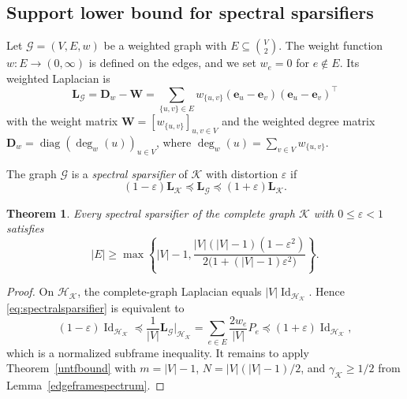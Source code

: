 \documentclass[a4paper]{amsart}
\numberwithin{equation}{section}
\newtheorem{theorem}{Theorem}[section]
\DeclareMathOperator{\diag}{diag}
\DeclareMathOperator{\Id}{Id}
\begin{document}
\subsection{Support lower bound for spectral sparsifiers}

Let $\mathcal G=(V,E,w)$ be a weighted graph with $E\subseteq\binom{V}{2}$.
The weight function $w:E\to(0,\infty)$ is defined on the edges, and we set $w_e=0$ for $e\notin E$.
Its weighted Laplacian is
\begin{equation}\label{eq:laplacian}
    \bm L_{\mathcal G}
    =\bm D_w-\bm W
    =\sum_{\{u,v\}\in E}w_{\{u,v\}} (\bm e_u-\bm e_v)(\bm e_u-\bm e_v)^\top
\end{equation}
with the weight matrix $\bm W = [w_{\{u,v\}}]_{u,v\in V}$ and the weighted degree matrix $\bm D_w = \diag(\deg_w(u))_{u\in V}$, where $\deg_w(u) = \sum_{v\in V} w_{\{u,v\}}$.

The graph $\mathcal G$ is a \emph{spectral sparsifier} of $\mathcal K$ with distortion $\varepsilon$ if
\begin{equation}\label{eq:spectralsparsifier}
    (1-\varepsilon)\bm L_{\mathcal K}
    \preceq \bm L_{\mathcal G}
    \preceq (1+\varepsilon)\bm L_{\mathcal K} .
\end{equation}

\begin{theorem}\label{spectralgraphbound}
    Every spectral sparsifier of the complete graph $\mathcal K$ with $0\le\varepsilon<1$ satisfies
    \begin{equation*}
        |E|\ge
        \max\left\{
        {|V|}-1,
        \frac{{|V|}({|V|}-1)(1-\varepsilon^2)}
             {2\big(1+({|V|}-1)\varepsilon^2\big)}
        \right\}.
    \end{equation*}
\end{theorem}

\begin{proof}
    On $\mathcal H_{\mathcal K}$, the complete-graph Laplacian equals ${|V|}\Id_{\mathcal H_{\mathcal K}}$.
    Hence \eqref{eq:spectralsparsifier} is equivalent to
    \begin{equation*}
        (1-\varepsilon)\Id_{\mathcal H_{\mathcal K}}
        \preceq \frac1{|V|}\bm L_{\mathcal G}\big|_{\mathcal H_{\mathcal K}}
        =\sum_{e\in E}\frac{2w_e}{{|V|}}P_e
        \preceq (1+\varepsilon)\Id_{\mathcal H_{\mathcal K}},
    \end{equation*}
    which is a normalized subframe inequality.
    It remains to apply Theorem~\ref{untfbound} with $m={|V|}-1$, $N={|V|}({|V|}-1)/2$, and $\gamma_{\mathcal K}\ge 1/2$ from Lemma~\ref{edgeframespectrum}.
\end{proof}
\end{document}
